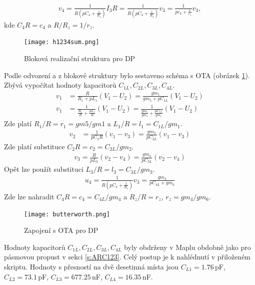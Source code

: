 \begin{align}
v_4 = \frac{1}{R(pC_4 + \frac{1}{R_z})}I_3R = \frac{1}{R(pC_4 + \frac{1}{R_z})}v_3 = \frac{1}{pc_4 + \frac{1}{r_z}}v_3,
\end{align}
kde $C_4R = c_4$ a $R/R_z = 1/r_z$.
\begin{figure}[h]
\centering
\texttt{[image: h1234sum.png]}
\caption{Bloková realizační struktura pro DP}
\end{figure}
Podle odvození a z blokové struktury bylo sestaveno schéma s OTA (obrázek \ref{s:OTADP}). Zbývá vypočítat hodnoty kapacitorů $C_{1L}, C_{2L}, C_{3L}, C_{4L}$.
\begin{align}
v_1 &= \frac{R}{R_1 + pL_1}(V_1 - U_2) = \frac{gm_1}{gm_5 + pC_{1L}}(V_1 - U_2)\\
v_1 &= \frac{1}{\frac{R_1}{R} + \frac{pL_1}{R}}(V_1 - U_2) = \frac{1}{\frac{gm_5}{gm_1} + \frac{pC_{1L}}{gm_1}}(V_1 - U_2)
\end{align}
Zde platí $R_1/R = r_1 = gm5/gm1$ a $L_1/R = l_1 = C_{1L}/gm_1$.
\begin{align}
v_2 &= \frac{1}{pC_2R}(v_1 - v_3) = \frac{gm_2}{pC_{2L}}(v_1 - v_3)
\end{align}
Zde platí substituce $C_2R = c_2 = C_{2L}/gm_2$.
\begin{align}
v_3 = \frac{R}{pL_3}(v_2 - v_4) = \frac{gm_3}{pC_{3L}}(v_2 - v_4)
\end{align}
Opět lze použít substituci $L_3/R = l_3 = C_{3L}/gm_3$.
\begin{align}
u_4 = \frac{1}{R(pC_4 + \frac{1}{R_z})}v_3 = \frac{gm_4}{pC_{4L} + gm_6}
\end{align}
Zde lze nahradit $C_4R = c_4 = C_{4L}/gm_4$ a $R_z/R = r_z$, $r_z = gm_4/gm_6$.
\begin{figure}[H]
\centering
\texttt{[image: butterworth.png]}
\caption{Zapojení s OTA pro DP \label{s:OTADP}}
\end{figure}
\noindent Hodnoty kapacitorů $C_{1L}, C_{2L}, C_{3L}, C_{4L}$ byly obdrženy v Maplu obdobně jako pro pásmovou propust v sekci \ref{s:ARC123}. Celý postup je k nahlédnutí v přiloženém skriptu. Hodnoty s přesností na dvě desetinná místa jsou $C_{L1} = 1.76$\,pF, $C_{L2} = 73.1$\,pF, $C_{L3} = 677.25$\,nF, $C_{L4} = 16.35$\,nF.
